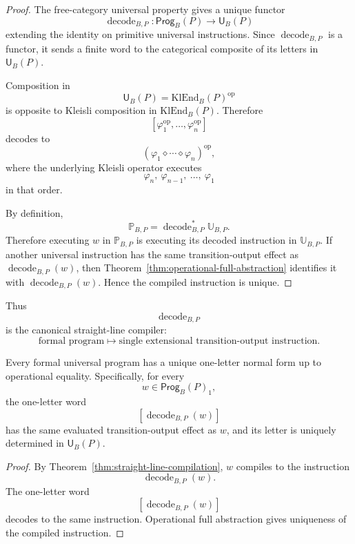 \begin{proof}
The free-category universal property gives a unique functor
\[
        \operatorname{decode}_{B,P}:
        \mathsf{Prog}_B(P)\to\mathsf U_B(P)
\]
extending the identity on primitive universal instructions.  Since
\(\operatorname{decode}_{B,P}\) is a functor, it sends a finite word to the categorical composite
of its letters in \(\mathsf U_B(P)\).

Composition in
\[
        \mathsf U_B(P)=\mathrm{KlEnd}_B(P)^{\operatorname{op}}
\]
is opposite to Kleisli composition in \(\mathrm{KlEnd}_B(P)\).  Therefore
\[
        [\varphi_1^{\operatorname{op}},\ldots,\varphi_n^{\operatorname{op}}]
\]
decodes to
\[
        (\varphi_1\diamond\cdots\diamond\varphi_n)^{\operatorname{op}},
\]
where the underlying Kleisli operator executes
\[
        \varphi_n,\ \varphi_{n-1},\ \ldots,\ \varphi_1
\]
in that order.

By definition,
\[
        \mathbb P_{B,P}
        =
        \operatorname{decode}_{B,P}^{\ast}\mathbb U_{B,P}.
\]
Therefore executing \(w\) in \(\mathbb P_{B,P}\) is executing its decoded instruction in
\(\mathbb U_{B,P}\).  If another universal instruction has the same transition-output effect as
\(\operatorname{decode}_{B,P}(w)\), then Theorem~\ref{thm:operational-full-abstraction} identifies
it with \(\operatorname{decode}_{B,P}(w)\).  Hence the compiled instruction is unique.
\end{proof}

Thus
\[
        \operatorname{decode}_{B,P}
\]
is the canonical straight-line compiler:
\[
        \text{formal program}
        \longmapsto
        \text{single extensional transition-output instruction}.
\]

\begin{corollary}
\label{cor:one-letter-normal-forms}
Every formal universal program has a unique one-letter normal form up to operational equality.
Specifically, for every
\[
        w\in \mathsf{Prog}_B(P)_1,
\]
the one-letter word
\[
        [\operatorname{decode}_{B,P}(w)]
\]
has the same evaluated transition-output effect as \(w\), and its letter is uniquely determined in
\(\mathsf U_B(P)\).
\end{corollary}

\begin{proof}
By Theorem~\ref{thm:straight-line-compilation}, \(w\) compiles to the instruction
\[
        \operatorname{decode}_{B,P}(w).
\]
The one-letter word
\[
        [\operatorname{decode}_{B,P}(w)]
\]
decodes to the same instruction.  Operational full abstraction gives uniqueness of the compiled
instruction.
\end{proof}

